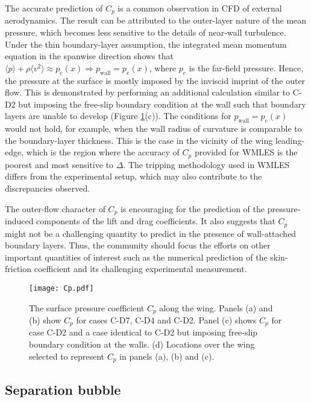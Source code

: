 \documentclass{ctr}
\begin{document}
The accurate prediction of $C_p$ is a common observation in CFD of
external aerodynamics. The result can be attributed to the outer-layer
nature of the mean pressure, which becomes less sensitive to the
details of near-wall turbulence.  Under the thin boundary-layer
assumption, the integrated mean momentum equation in the spanwise
direction shows that $\langle p \rangle + \rho \langle v^2 \rangle
\approx p_e(x) \Rightarrow p_\mathrm{wall} = p_e(x)$, where $p_e$ is
the far-field pressure.  Hence, the pressure at the surface is mostly
imposed by the inviscid imprint of the outer flow.  This is demonstrated
by performing an additional calculation similar to C-D2 but imposing
the free-slip boundary condition at the wall such that boundary layers
are unable to develop (Figure \ref{fig:Cp}(c)). The conditions for
$p_\mathrm{wall} = p_e(x)$ would not hold, for example, when the wall
radius of curvature is comparable to the boundary-layer
thickness. This is the case in the vicinity of the wing leading-edge,
which is the region where the accuracy of $C_p$ provided for WMLES is
the poorest and most sensitive to $\Delta$. The tripping methodology
used in WMLES differs from the experimental setup, which may also
contribute to the discrepancies observed.

The outer-flow character of $C_p$ is encouraging for the prediction of
the pressure-induced components of the lift and drag coefficients.  It
also suggests that $C_p$ might not be a challenging quantity to
predict in the presence of wall-attached boundary layers.  Thus, the
community should focus the efforts on other important quantities of
interest such as the numerical prediction of the skin-friction
coefficient and its challenging experimental measurement.
%
\begin{figure}
\begin{center}
\texttt{[image: Cp.pdf]}
\end{center}
\caption{ The surface pressure coefficient $C_p$ along the
  wing. Panels (a) and (b) show $C_p$ for cases C-D7, C-D4 and
  C-D2. Panel (c) shows $C_p$ for case C-D2 and a case identical to
  C-D2 but imposing free-slip boundary condition at the walls. (d)
  Locations over the wing selected to represent $C_p$ in panels (a),
  (b) and (c). \label{fig:Cp}}
\end{figure}

\subsection{Separation bubble}\label{subsec:bubble}
\end{document}
